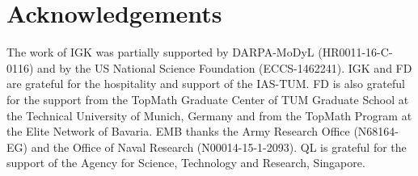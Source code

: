 \documentclass[%
 aip,
 cha,
 sd,%
 amsmath,amssymb,
 preprint,%
]{revtex4-1}
\begin{document}
 

\section*{Acknowledgements}
The work of IGK was partially supported by DARPA-MoDyL (HR0011-16-C-0116) and by the US National Science Foundation (ECCS-1462241).
IGK and FD are grateful for the hospitality and support of the IAS-TUM. FD is also grateful for the support from the TopMath Graduate Center of TUM Graduate School at the Technical University of Munich, Germany and from the TopMath Program at the Elite Network of Bavaria. EMB thanks the Army Research Office (N68164-EG) and the Office of Naval Research (N00014-15-1-2093). QL is grateful for the support of the Agency for Science, Technology and Research, Singapore.


\nocite{*}
\end{document}
